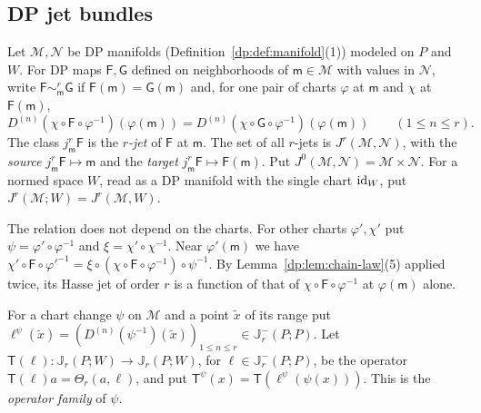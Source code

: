 \subsection{DP jet bundles}\label{dp:ssec:jets}

\begin{definition}\label{dp:def:jets}
Let $\mathcal M,\mathcal N$ be DP manifolds (Definition~\ref{dp:def:manifold}(1)) modeled on $P$ and $W$. For DP maps $\mathsf F,\mathsf G$ defined on neighborhoods of $\mathsf m\in\mathcal M$ with values in $\mathcal N$, write $\mathsf F\sim^r_{\mathsf m}\mathsf G$ if $\mathsf F(\mathsf m)=\mathsf G(\mathsf m)$ and, for one pair of charts $\varphi$ at $\mathsf m$ and $\chi$ at $\mathsf F(\mathsf m)$,
\[
 D^{(n)}(\chi\circ\mathsf F\circ\varphi^{-1})(\varphi(\mathsf m))=D^{(n)}(\chi\circ\mathsf G\circ\varphi^{-1})(\varphi(\mathsf m))\qquad(1\le n\le r).
\]
The class $j^r_{\mathsf m}\mathsf F$ is the \emph{$r$-jet} of $\mathsf F$ at $\mathsf m$. The set of all $r$-jets is $J^r(\mathcal M,\mathcal N)$, with the \emph{source} $j^r_{\mathsf m}\mathsf F\mapsto\mathsf m$ and the \emph{target} $j^r_{\mathsf m}\mathsf F\mapsto\mathsf F(\mathsf m)$. Put $J^0(\mathcal M,\mathcal N)=\mathcal M\times\mathcal N$. For a normed space $W$, read as a DP manifold with the single chart $\mathrm{id}_W$, put $J^r(\mathcal M;W)=J^r(\mathcal M,W)$.
\end{definition}

The relation does not depend on the charts. For other charts $\varphi',\chi'$ put $\psi=\varphi'\circ\varphi^{-1}$ and $\xi=\chi'\circ\chi^{-1}$. Near $\varphi'(\mathsf m)$ we have $\chi'\circ\mathsf F\circ\varphi'^{-1}=\xi\circ(\chi\circ\mathsf F\circ\varphi^{-1})\circ\psi^{-1}$. By Lemma~\ref{dp:lem:chain-law}(5) applied twice, its Hasse jet of order $r$ is a function of that of $\chi\circ\mathsf F\circ\varphi^{-1}$ at $\varphi(\mathsf m)$ alone.

For a chart change $\psi$ on $\mathcal M$ and a point $\tilde x$ of its range put $\ell^\psi(\tilde x)=(D^{(n)}(\psi^{-1})(\tilde x))_{1\le n\le r}\in\mathbb J^-_r(P;P)$. Let $\mathsf T(\ell)\colon\mathbb J_r(P;W)\to\mathbb J_r(P;W)$, for $\ell\in\mathbb J^-_r(P;P)$, be the operator $\mathsf T(\ell)a=\Theta_r(a,\ell)$, and put $\mathsf T^\psi(x)=\mathsf T(\ell^\psi(\psi(x)))$. This is the \emph{operator family} of $\psi$.

